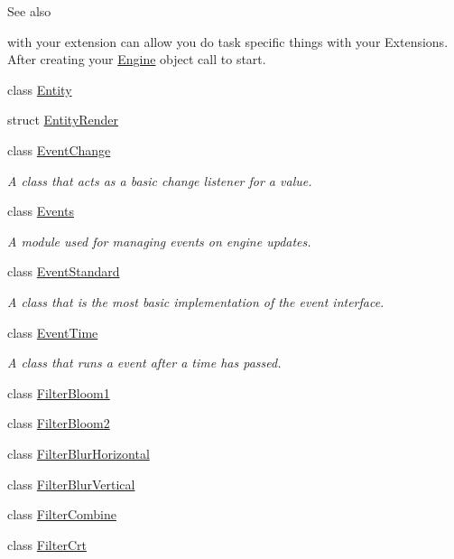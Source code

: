 \begin{DoxyCompactItemize}
\begin{DoxyCompactList}
\begin{DoxySeeAlso}{See also}
\end{DoxySeeAlso}
with your extension can allow you do task specific things with your Extensions. After creating your \hyperlink{class_flounder_1_1_engine}{Engine} object call  to start. \end{DoxyCompactList}\item 
class \hyperlink{class_flounder_1_1_entity}{Entity}
\item 
struct \hyperlink{struct_flounder_1_1_entity_render}{Entity\+Render}
\item 
class \hyperlink{class_flounder_1_1_event_change}{Event\+Change}
\begin{DoxyCompactList}\small\item\em A class that acts as a basic change listener for a value. \end{DoxyCompactList}\item 
class \hyperlink{class_flounder_1_1_events}{Events}
\begin{DoxyCompactList}\small\item\em A module used for managing events on engine updates. \end{DoxyCompactList}\item 
class \hyperlink{class_flounder_1_1_event_standard}{Event\+Standard}
\begin{DoxyCompactList}\small\item\em A class that is the most basic implementation of the event interface. \end{DoxyCompactList}\item 
class \hyperlink{class_flounder_1_1_event_time}{Event\+Time}
\begin{DoxyCompactList}\small\item\em A class that runs a event after a time has passed. \end{DoxyCompactList}\item 
class \hyperlink{class_flounder_1_1_filter_bloom1}{Filter\+Bloom1}
\item 
class \hyperlink{class_flounder_1_1_filter_bloom2}{Filter\+Bloom2}
\item 
class \hyperlink{class_flounder_1_1_filter_blur_horizontal}{Filter\+Blur\+Horizontal}
\item 
class \hyperlink{class_flounder_1_1_filter_blur_vertical}{Filter\+Blur\+Vertical}
\item 
class \hyperlink{class_flounder_1_1_filter_combine}{Filter\+Combine}
\item 
class \hyperlink{class_flounder_1_1_filter_crt}{Filter\+Crt}

\end{DoxyCompactItemize}
